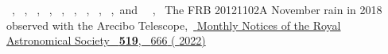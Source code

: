 \documentclass[reprint,amsmath,amssymb,showkeys,prd]{revtex4-2}
\begin{document}
\begin{thebibliography}{33}
      \BibitemOpen
       { {\ },  {\ },  {~},  {\ },  {\ },  {~},  {\ },  {~},  {~},\ and\  {\ },\ } { {The {{FRB 20121102A November}} rain in 2018 observed with the {{Arecibo Telescope}}},\ }\href {https://doi.org/10.1093/mnras/stac3446} { { {Monthly Notices of the Royal Astronomical Society}\ }\textbf { {519}},\  {666} ( {2022})}%
    \end{thebibliography}%
\end{document}
